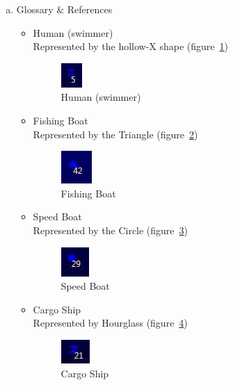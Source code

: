\documentclass[12pt]{article}
\begin{document}
\begin{enumerate} [(a)]
\clearpage

\vspace*{0.2in}
\item Glossary \& References\\
\begin{itemize}
\item Human (swimmer)\\
Represented by the hollow-X shape (figure~\ref{fig:Human (swimmer)})
\begin{figure}[h!]
    \centering
    \includegraphics[scale=1]{leg1}
    \caption{Human (swimmer)}
    \label{fig:Human (swimmer)}
\end{figure}\par

\item Fishing Boat\\
Represented by the Triangle (figure~\ref{fig:Fishing Boat})
\begin{figure}[h!]
    \centering
    \includegraphics[scale=1]{leg2}
    \caption{Fishing Boat}
    \label{fig:Fishing Boat}
\end{figure}\par

\item Speed Boat\\
Represented by the Circle (figure~\ref{fig:Speed Boat})
\begin{figure}[h!]
    \centering
    \includegraphics[scale=1]{leg3}
    \caption{Speed Boat}
    \label{fig:Speed Boat}
\end{figure}\par

\item Cargo Ship\\
Represented by Hourglass (figure~\ref{fig:Cargo Ship})
\begin{figure}[h!]
    \centering
    \includegraphics[scale=1]{leg4}
    \caption{Cargo Ship}
    \label{fig:Cargo Ship}
\end{figure}\par


\end{itemize}
\end{enumerate}
\end{document}
